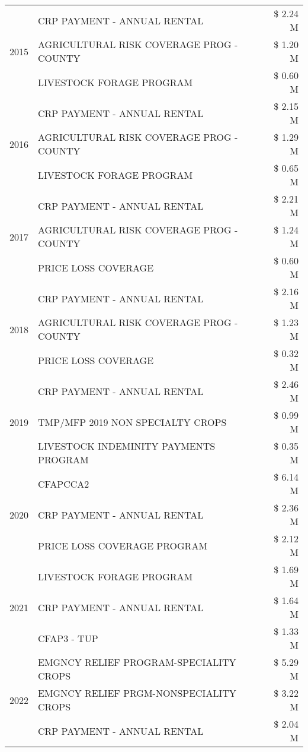 \begin{tabular}{llr}
\cline{1-3}
\multirow[t]{3}{*}{2015} & CRP PAYMENT - ANNUAL RENTAL & \$ 2.24 M \\
 & AGRICULTURAL RISK COVERAGE PROG - COUNTY & \$ 1.20 M \\
 & LIVESTOCK FORAGE PROGRAM & \$ 0.60 M \\
\cline{1-3}
\multirow[t]{3}{*}{2016} & CRP PAYMENT - ANNUAL RENTAL & \$ 2.15 M \\
 & AGRICULTURAL RISK COVERAGE PROG - COUNTY & \$ 1.29 M \\
 & LIVESTOCK FORAGE PROGRAM & \$ 0.65 M \\
\cline{1-3}
\multirow[t]{3}{*}{2017} & CRP PAYMENT - ANNUAL RENTAL & \$ 2.21 M \\
 & AGRICULTURAL RISK COVERAGE PROG - COUNTY & \$ 1.24 M \\
 & PRICE LOSS COVERAGE & \$ 0.60 M \\
\cline{1-3}
\multirow[t]{3}{*}{2018} & CRP PAYMENT - ANNUAL RENTAL & \$ 2.16 M \\
 & AGRICULTURAL RISK COVERAGE PROG - COUNTY & \$ 1.23 M \\
 & PRICE LOSS COVERAGE & \$ 0.32 M \\
\cline{1-3}
\multirow[t]{3}{*}{2019} & CRP PAYMENT - ANNUAL RENTAL & \$ 2.46 M \\
 & TMP/MFP 2019 NON SPECIALTY CROPS & \$ 0.99 M \\
 & LIVESTOCK INDEMINITY PAYMENTS PROGRAM & \$ 0.35 M \\
\cline{1-3}
\multirow[t]{3}{*}{2020} & CFAPCCA2 & \$ 6.14 M \\
 & CRP PAYMENT - ANNUAL RENTAL & \$ 2.36 M \\
 & PRICE LOSS COVERAGE PROGRAM & \$ 2.12 M \\
\cline{1-3}
\multirow[t]{3}{*}{2021} & LIVESTOCK FORAGE PROGRAM & \$ 1.69 M \\
 & CRP PAYMENT - ANNUAL RENTAL & \$ 1.64 M \\
 & CFAP3 - TUP & \$ 1.33 M \\
\cline{1-3}
\multirow[t]{3}{*}{2022} & EMGNCY RELIEF PROGRAM-SPECIALITY CROPS & \$ 5.29 M \\
 & EMGNCY RELIEF PRGM-NONSPECIALITY CROPS & \$ 3.22 M \\
 & CRP PAYMENT - ANNUAL RENTAL & \$ 2.04 M \\
\cline{1-3}
\bottomrule
\end{tabular}
